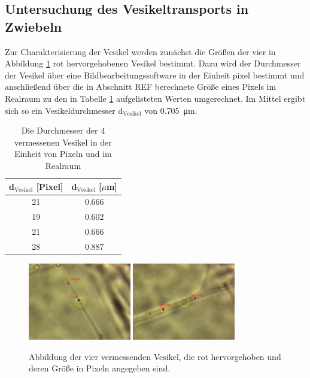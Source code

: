     \subsection{Untersuchung des Vesikeltransports in Zwiebeln}
        \FloatBarrier
        Zur Charakterisierung der Vesikel werden zunächst die Größen der vier in Abbildung \ref{fig:vesikel_size} rot hervorgehobenen Vesikel bestimmt. Dazu wird der Durchmesser der Vesikel über eine 
        Bildbearbeitungssoftware in der Einheit pixel bestimmt und anschließend über die in Abschnitt REF berechnete Größe eines Pixels im Realraum zu den in Tabelle \ref{tab:d_vesikel} aufgelisteten Werten 
        umgerechnet. Im Mittel ergibt sich so ein Vesikeldurchmesser d$_\text{Vesikel}$ von \SI{0.705}{\micro\metre}.
        \begin{table}[h]
            \centering
            \caption{Die Durchmesser der 4 vermessenen Vesikel in der Einheit von Pixeln und im Realraum}
            \label{tab:d_vesikel}
            \begin{tabular}{c c}
            \toprule
            {d$_\text{Vesikel}$ [Pixel]} & {d$_\text{Vesikel}$ [$\mu$m]}  \\
            \midrule
            21	 &  0.666  \\
            19	 &  0.602  \\
            21	 &  0.666  \\
            28	 &  0.887  \\
            \bottomrule
            \end{tabular}
        \end{table}
        \begin{figure}[h]
        \centering
        \includegraphics[width = 0.4\textwidth]{pictures/vesikel_size_1.png}
        \includegraphics[width = 0.4\textwidth]{pictures/vesikel_size_2.png}
        \caption{Abbildung der vier vermessenden Vesikel, die rot hervorgehoben und deren Größe in Pixeln angegeben sind.}
        \label{fig:vesikel_size}
        \end{figure}

